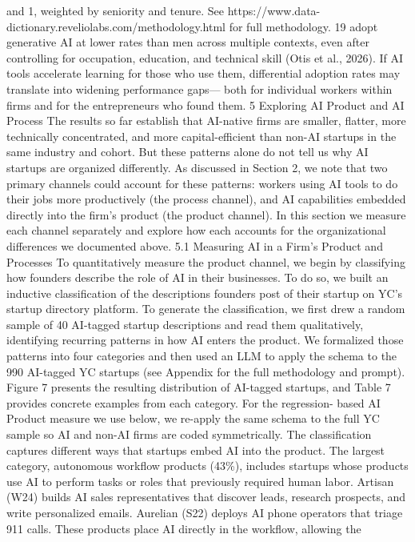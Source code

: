 and 1, weighted by seniority and tenure. See https://www.data-dictionary.reveliolabs.com/methodology.html
for full methodology.
19
adopt generative AI at lower rates than men across multiple contexts, even after controlling for
occupation, education, and technical skill (Otis et al., 2026). If AI tools accelerate learning for
those who use them, differential adoption rates may translate into widening performance gaps—
both for individual workers within firms and for the entrepreneurs who found them.
5
Exploring AI Product and AI Process
The results so far establish that AI-native firms are smaller, flatter, more technically concentrated,
and more capital-efficient than non-AI startups in the same industry and cohort. But these patterns
alone do not tell us why AI startups are organized differently. As discussed in Section 2, we note
that two primary channels could account for these patterns: workers using AI tools to do their
jobs more productively (the process channel), and AI capabilities embedded directly into the firm’s
product (the product channel). In this section we measure each channel separately and explore how
each accounts for the organizational differences we documented above.
5.1
Measuring AI in a Firm’s Product and Processes
To quantitatively measure the product channel, we begin by classifying how founders describe the
role of AI in their businesses. To do so, we built an inductive classification of the descriptions
founders post of their startup on YC’s startup directory platform. To generate the classification,
we first drew a random sample of 40 AI-tagged startup descriptions and read them qualitatively,
identifying recurring patterns in how AI enters the product. We formalized those patterns into
four categories and then used an LLM to apply the schema to the 990 AI-tagged YC startups (see
Appendix for the full methodology and prompt). Figure 7 presents the resulting distribution of
AI-tagged startups, and Table 7 provides concrete examples from each category. For the regression-
based AI Product measure we use below, we re-apply the same schema to the full YC sample so AI
and non-AI firms are coded symmetrically.
The classification captures different ways that startups embed AI into the product. The largest
category, autonomous workflow products (43\%), includes startups whose products use AI to perform
tasks or roles that previously required human labor. Artisan (W24) builds AI sales representatives
that discover leads, research prospects, and write personalized emails. Aurelian (S22) deploys AI
phone operators that triage 911 calls. These products place AI directly in the workflow, allowing the
